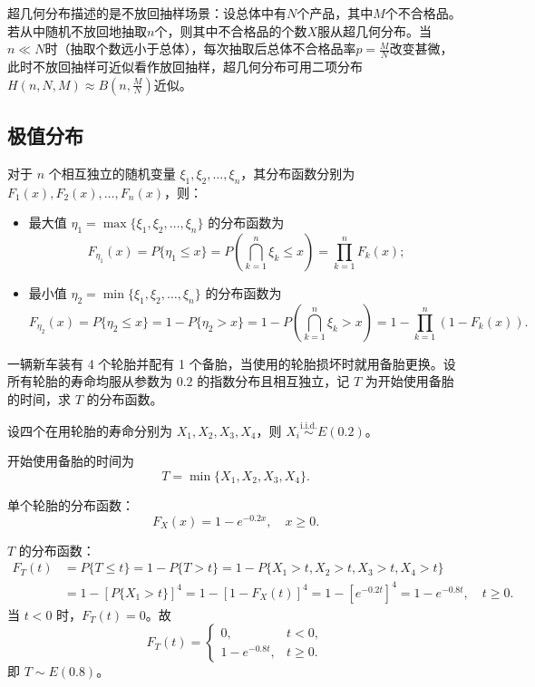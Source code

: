 ﻿\documentclass[lang=cn,11pt]{elegantbook}
\begin{document}
\begin{note}
超几何分布描述的是不放回抽样场景：设总体中有$N$个产品，其中$M$个不合格品。若从中随机不放回地抽取$n$个，则其中不合格品的个数$X$服从超几何分布。当$n \ll N$时（抽取个数远小于总体），每次抽取后总体不合格品率$p=\frac{M}{N}$改变甚微，此时不放回抽样可近似看作放回抽样，超几何分布可用二项分布$H(n,N,M) \approx B(n,\frac{M}{N})$近似。
\end{note}

\subsection{极值分布} \label{subsec:extreme-dist}
\begin{property}\label{prop:extreme-value}
对于 $n$ 个相互独立的随机变量 $\xi_1,\xi_2,\dots,\xi_n$，其分布函数分别为 $F_1(x),F_2(x),\dots,F_n(x)$，则：
\begin{itemize}
    \item 最大值 $\eta_1 = \max\{\xi_1,\xi_2,\dots,\xi_n\}$ 的分布函数为
    \[
    F_{\eta_1}(x) = P\{\eta_1 \le x\} = P\left(\bigcap_{k=1}^n \xi_k \le x\right) = \prod_{k=1}^n F_k(x);
    \]
    \item 最小值 $\eta_2 = \min\{\xi_1,\xi_2,\dots,\xi_n\}$ 的分布函数为
    \[
    F_{\eta_2}(x) = P\{\eta_2 \le x\} = 1 - P\{\eta_2 > x\} = 1 - P\left(\bigcap_{k=1}^n \xi_k > x\right) = 1 - \prod_{k=1}^n (1-F_k(x)).
    \]
\end{itemize}
\end{property}


\begin{exercise} \label{exer:2-61}
一辆新车装有 4 个轮胎并配有 1 个备胎，当使用的轮胎损坏时就用备胎更换。设所有轮胎的寿命均服从参数为 $0.2$ 的指数分布且相互独立，记 $T$ 为开始使用备胎的时间，求 $T$ 的分布函数。
\end{exercise}

\begin{solution}
设四个在用轮胎的寿命分别为 $X_1,X_2,X_3,X_4$，则 $X_i\stackrel{\text{i.i.d.}}{\sim}E(0.2)$。

开始使用备胎的时间为
\[
T = \min\{X_1,X_2,X_3,X_4\}.
\]

单个轮胎的分布函数：
\[
F_X(x) = 1-e^{-0.2x},\quad x\geqslant0.
\]

$T$ 的分布函数：
\[
\begin{aligned}
F_T(t) &= P\{T\leqslant t\} = 1-P\{T>t\} = 1-P\{X_1>t, X_2>t, X_3>t, X_4>t\} \\
&= 1-\left[P\{X_1>t\}\right]^4 = 1-\left[1-F_X(t)\right]^4 = 1-\left[e^{-0.2t}\right]^4 = 1-e^{-0.8t},\quad t\geqslant0.
\end{aligned}
\]
当 $t<0$ 时，$F_T(t)=0$。故
\[
F_T(t)=
\begin{cases}
0, & t<0, \\[4pt]
1-e^{-0.8t}, & t\geqslant0.
\end{cases}
\]
即 $T\sim E(0.8)$。
\end{solution}
\end{document}
